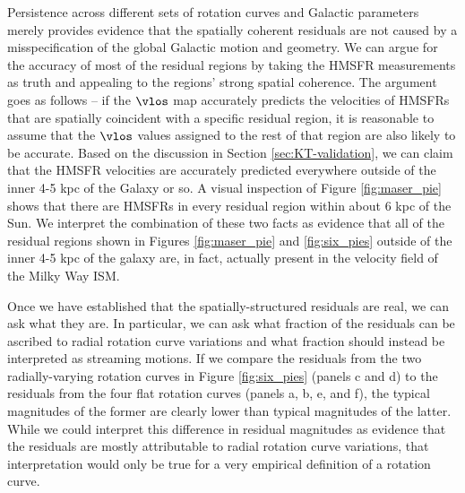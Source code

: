 Persistence across different sets of rotation curves and Galactic parameters merely provides evidence that the spatially coherent residuals are not caused by a misspecification of the global Galactic motion and geometry.
We can argue for the accuracy of most of the residual regions by taking the HMSFR measurements as truth and appealing to the regions' strong spatial coherence.
The argument goes as follows -- if the $\vlos$ map accurately predicts the velocities of HMSFRs that are spatially coincident with a specific residual region, it is reasonable to assume that the $\vlos$ values assigned to the rest of that region are also likely to be accurate. 
Based on the discussion in Section \ref{sec:KT-validation}, we can claim that the HMSFR velocities are accurately predicted everywhere outside of the inner 4-5 kpc of the Galaxy or so.
A visual inspection of Figure \ref{fig:maser_pie} shows that there are HMSFRs in every residual region within about 6 kpc of the Sun. 
We interpret the combination of these two facts as evidence that all of the residual regions shown in Figures \ref{fig:maser_pie} and \ref{fig:six_pies} outside of the inner 4-5 kpc of the galaxy are, in fact, actually present in the velocity field of the Milky Way ISM. 

Once we have established that the spatially-structured residuals are real, we can ask what they are.
In particular, we can ask what fraction of the residuals can be ascribed to radial rotation curve variations and what fraction should instead be interpreted as streaming motions. 
If we compare the residuals from the two radially-varying rotation curves in Figure \ref{fig:six_pies} (panels c and d) to the residuals from the four flat rotation curves (panels a, b, e, and f), the typical magnitudes of the former are clearly lower than typical magnitudes of the latter. 
While we could interpret this difference in residual magnitudes as evidence that the residuals are mostly attributable to radial rotation curve variations, that interpretation would only be true for a very empirical definition of a rotation curve.

